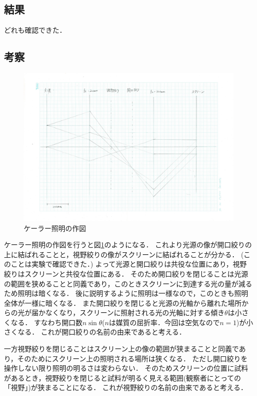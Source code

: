 \documentclass[titlepage]{jsarticle}
\begin{document}
\subsection{結果}
どれも確認できた．

\subsection{考察}

\begin{figure}[htbp]
    \centering
    \includegraphics[width=15cm]{kohler_fig.jpg}
    \caption{ケーラー照明の作図}
    \label{fig:kohler_fig}
\end{figure}

ケーラー照明の作図を行うと図\ref{fig:kohler_fig}のようになる．
これより光源の像が開口絞りの上に結ばれることと，視野絞りの像がスクリーンに結ばれることが分かる．
(このことは実験で確認できた．)
よって光源と開口絞りは共役な位置にあり，視野絞りはスクリーンと共役な位置にある．
そのため開口絞りを閉じることは光源の範囲を狭めることと同義であり，このときスクリーンに到達する光の量が減るため照明は暗くなる．
後に説明するように照明は一様なので，このときも照明全体が一様に暗くなる．
また開口絞りを閉じると光源の光軸から離れた場所からの光が届かなくなり，スクリーンに照射される光の光軸に対する傾き$\theta$は小さくなる．
すなわち開口数$n\sin{\theta}$($n$は媒質の屈折率．今回は空気なので$n=1$)が小さくなる．
これが開口絞りの名前の由来であると考える．

一方視野絞りを閉じることはスクリーン上の像の範囲が狭まることと同義であり，そのためにスクリーン上の照明される場所は狭くなる．
ただし開口絞りを操作しない限り照明の明るさは変わらない．
そのためスクリーンの位置に試料があるとき，視野絞りを閉じると試料が明るく見える範囲(観察者にとっての「視野」)が狭まることになる．
これが視野絞りの名前の由来であると考える．
\end{document}
